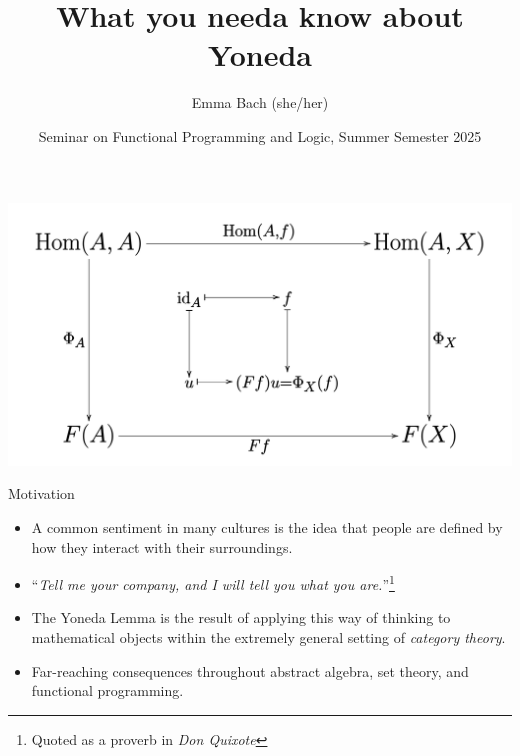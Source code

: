 \documentclass[aspectratio=169]{beamer} %
\title{What you needa know about Yoneda}
\author{Emma Bach (she/her)}
\date{Seminar on Functional Programming and Logic, Summer Semester 2025}
\begin{document}
{

\begin{frame}[plain]
    \includegraphics[width=0.4\paperwidth]{figures/Yoneda_lemma_cd.svg.png}
    \titlepage
\end{frame}

\begin{frame}{Motivation}
 \begin{itemize}
  \item A common sentiment in many cultures is the idea that people are defined by how they interact with their surroundings.
  \pause\item ``\textit{Tell me your company, and I will tell you what you are.}''\footnote{Quoted as a proverb in \textit{Don Quixote}}
  \pause\item The Yoneda Lemma is the result of applying this way of thinking to mathematical objects within the extremely general setting of \textit{category theory}.
  \pause\item Far-reaching consequences throughout abstract algebra, set theory, and functional programming.
 \end{itemize}
\end{frame}

}
\end{document}
